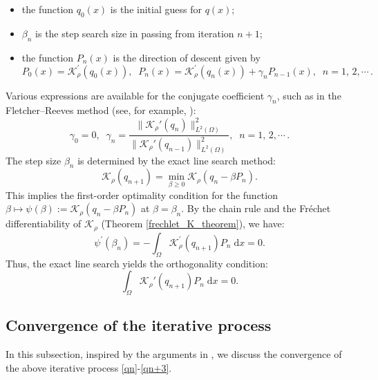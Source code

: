 \documentclass[a4paper,12pt,reqno,natbib]{amsart}
\newcommand{\dx} {\displaystyle\mathrm{d}x}
\begin{document}
{\begin{itemize}
    \item[-] the function $q_0(x)$ is the initial guess for $q(x)$;
    
    \item[-] $\beta_n$ is the step search size in passing from iteration $n+1$;
    
    \item[-] the function $P_n(x)$ is the direction of descent given by
\begin{equation} \label{qn+2}
     P_0(x)=\mathcal{K}_\rho ^\prime(q_0(x)),\;\; P_n(x)=\mathcal{K}_\rho ^\prime(q_n(x))+\gamma_n P_{n-1}(x),\;\; n=1,\,2,\cdots\,.
\end{equation}
\end{itemize}
Various expressions are available for the
 conjugate coefficient $\gamma_n$, such as in the Fletcher–Reeves method (see, for example, \cite{daniel1971approximate,fletcher1964function}):
\begin{equation} \label{qn+3}
    \gamma_0=0,\;\; \gamma_n=\frac{\|\mathcal{K}_\rho '(q_n)\|^2_{L^2(\Omega)}}{\|\mathcal{K}_\rho '(q_{n-1})\|^2_{L^2(\Omega)}},\;\; n=1,\,2,\cdots\,.
\end{equation}
The step size $\beta_n$ is determined by the exact line search method:
\begin{equation}\label{min_beta_n}
\mathcal{K}_\rho(q_{n+1}) = \min_{\beta \geq 0} \mathcal{K}_\rho(q_n - \beta P_n).
\end{equation}
This implies the first-order optimality condition for the function $\beta\longmapsto\psi(\beta) := \mathcal{K}_\rho (q_n - \beta P_n)$ at $\beta = \beta_n$. By the chain rule and the Fréchet differentiability of $\mathcal{K}_\rho$ (Theorem \ref{frechlet_K_theorem}), we have:
\[
\psi^\prime(\beta_n) = -\int_{\Omega} \mathcal{K}_\rho^\prime(q_{n+1}) P_n \;\dx = 0.
\]
Thus, the exact line search yields the orthogonality condition:
\begin{equation} \label{min_beta_n_2}
\int_{\Omega}  \mathcal{K}_\rho'(q_{n+1}) P_n \;\dx = 0.
\end{equation}

\subsection{Convergence of the iterative process}\label{sec:cv-vvvv}

In this subsection, inspired by the arguments in \cite{dai1996convergence}, we discuss the convergence of the above iterative process \eqref{qn}-\eqref{qn+3}.

}
\end{document}
